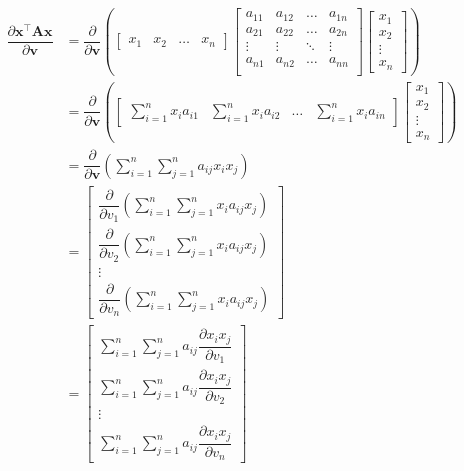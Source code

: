 \documentclass{article}
\newcommand{\trans}{\top}
\begin{document}
\begin{align}
    \dfrac{\partial \mathbf{x}^\trans \mathbf{A} \mathbf{x}}{\partial \mathbf{v}} &= \dfrac{\partial}{\partial \mathbf{v}} \left(
    \begin{bmatrix}
        x_{1} & x_{2} & \dots & x_{n}
    \end{bmatrix}
    \begin{bmatrix}
        a_{11} & a_{12} & \dots & a_{1n} \\
        a_{21} & a_{22} & \dots & a_{2n} \\
        \vdots & \vdots & \ddots & \vdots \\
        a_{n1} & a_{n2} & \dots & a_{nn} \\
    \end{bmatrix} \begin{bmatrix}
        x_{1} \\ x_{2} \\ \vdots \\ x_{n}
    \end{bmatrix} \right) \\
    &= \dfrac{\partial}{\partial \mathbf{v}} \left(
			\begin{bmatrix}
				\displaystyle \sum_{i = 1}^{n} x_{i}a_{i1} & 
				\displaystyle \sum_{i = 1}^{n} x_{i}a_{i2} & 
				\dots & 
				\displaystyle \sum_{i = 1}^{n} x_{i}a_{in}
			\end{bmatrix} \begin{bmatrix}
				x_{1} \\ x_{2} \\ \vdots \\ x_{n}
			\end{bmatrix} \right) \\
            &= \dfrac{\partial}{\partial \mathbf{v}} \left(
				\sum_{i = 1}^{n}\sum_{j = 1}^{n} a_{ij} x_{i} x_{j}
			\right) \\
    &= \begin{bmatrix}
        \displaystyle \dfrac{\partial}{\partial v_1} \left( \sum_{i = 1}^{n}\sum_{j = 1}^{n} x_{i} a_{ij} x_{j} \right) \\ 
        \displaystyle  \dfrac{\partial}{\partial v_2} \left( \sum_{i = 1}^{n}\sum_{j = 1}^{n} x_{i} a_{ij} x_{j} \right) \\ 
        \vdots \\ 
        \displaystyle \dfrac{\partial}{\partial v_n} \left( \sum_{i = 1}^{n}\sum_{j = 1}^{n} x_{i} a_{ij} x_{j} \right) 
    \end{bmatrix} \\
    &= \begin{bmatrix}
        \displaystyle \sum_{i = 1}^{n}\sum_{j = 1}^{n} a_{ij} \dfrac{\partial x_{i}x_{j}}{\partial v_1} \\ 
        \displaystyle \sum_{i = 1}^{n}\sum_{j = 1}^{n} a_{ij} \dfrac{\partial x_{i}x_{j}}{\partial v_2} \\ 
        \vdots \\ 
        \displaystyle \sum_{i = 1}^{n}\sum_{j = 1}^{n} a_{ij} \dfrac{\partial x_{i}x_{j}}{\partial v_n} 
    \end{bmatrix}
\end{align}
\end{document}
